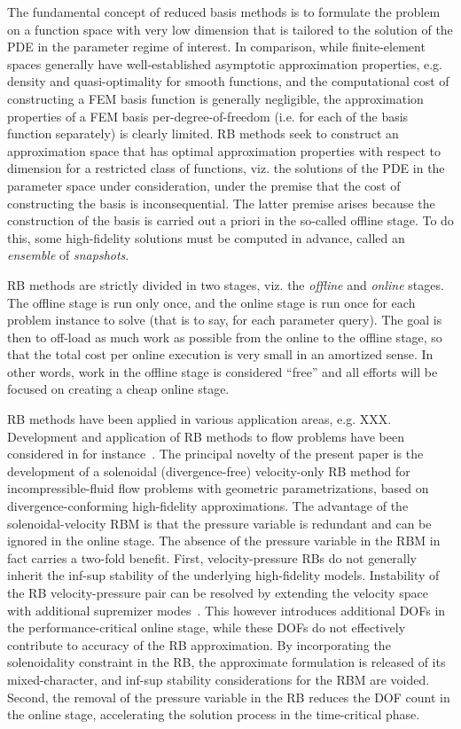 \documentclass[onecolumn, twoside, a4paper, 11pt]{article}
\begin{document}
The fundamental concept of reduced basis methods is to formulate the problem on
a function space with very low dimension that is tailored to the solution of the
PDE in the parameter regime of interest. In comparison, while finite-element spaces
generally have well-established asymptotic approximation properties, e.g. density and
quasi-optimality for smooth functions, and the computational cost of constructing a FEM basis
function is generally negligible, the approximation properties of a FEM basis per-degree-of-freedom
(i.e. for each of the basis function separately) is clearly limited. RB methods seek
to construct an approximation space that has optimal approximation properties with respect
to dimension for a restricted class of functions, viz. the solutions of the PDE in the parameter space
under consideration, under the premise that the cost of constructing the basis is inconsequential. The
latter premise arises because the construction of the basis is carried out a priori in the so-called
offline stage. To do this, some high-fidelity solutions must be computed in advance, called
an \emph{ensemble} of \emph{snapshots}.

RB methods are strictly divided in two stages, viz. the \emph{offline} and
\emph{online} stages. The offline stage is run only once, and the online stage
is run once for each problem instance to solve (that is to say, for each
parameter query). The goal is then to off-load as much work as possible from the
online to the offline stage, so that the total cost per online execution is very
small in an amortized sense. In other words, work in the offline stage is
considered ``free'' and all efforts will be focused on creating a cheap online stage.

RB methods have been applied in various application areas, e.g. XXX. Development and
application of RB methods to flow problems have been considered in for instance~\cite{}.
The principal novelty of the present paper is the development of a solenoidal (divergence-free)
velocity-only RB method for incompressible-fluid flow problems with geometric parametrizations, based on
divergence-conforming high-fidelity approximations. The advantage of the solenoidal-velocity RBM is that
the pressure variable
is redundant and can be ignored in the online stage. The absence of the pressure
variable in the RBM in fact carries a two-fold benefit. First, velocity-pressure RBs do not generally inherit
the inf-sup stability of the underlying high-fidelity models. Instability of the RB
velocity-pressure pair can be resolved by extending the velocity space with additional
supremizer modes~\cite{Ballarin2015ssp}. This however introduces additional DOFs in the
performance-critical online stage, while these DOFs do not effectively contribute to
accuracy of the RB approximation. By incorporating the solenoidality constraint in the RB,
the approximate formulation is released of its mixed-character, and inf-sup stability
considerations for the RBM are voided. Second, the removal of the pressure variable in the RB reduces
the DOF count in the online stage, accelerating the solution process in the time-critical
phase.
\end{document}
